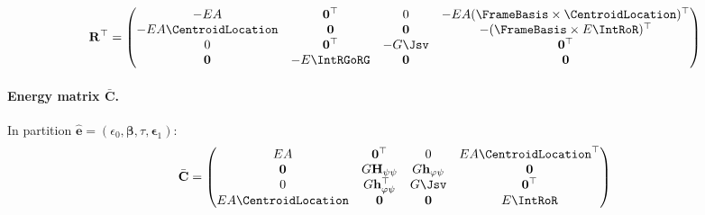 \[\mathbf{R}^\top = \begin{pmatrix}
-EA & \mathbf{0}^\top & 0 & -EA(\FrameBasis \times \CentroidLocation)^\top \\
-EA\CentroidLocation & \mathbf{0} & \mathbf{0} & -(\FrameBasis \times E\IntRoR)^\top \\
0 & \mathbf{0}^\top & -G\Jsv & \mathbf{0}^\top \\
\mathbf{0} & -E\IntRGoRG & \mathbf{0} & \mathbf{0}
\end{pmatrix}\]


\paragraph{Energy matrix \(\bar{\mathbf{C}}\).}

In partition
\(\hat{\bm{e}} = (\epsilon_0, \bm{\beta}, \tau, \bm{\epsilon}_1)\):
\[\bar{\mathbf{C}} = \begin{pmatrix}
EA & \mathbf{0}^\top & 0 & EA\CentroidLocation^\top \\
\mathbf{0} & G\mathbf{H}_{\psi\psi} & G\mathbf{h}_{\varphi\psi} & \mathbf{0} \\
0 & G\mathbf{h}_{\varphi\psi}^\top & G\Jsv & \mathbf{0}^\top \\
EA\CentroidLocation & \mathbf{0} & \mathbf{0} & E\IntRoR
\end{pmatrix}
\]

